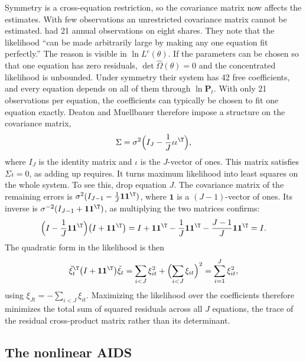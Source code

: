 Symmetry is a cross-equation restriction, so the covariance matrix now affects the estimates. With few
observations an unrestricted covariance matrix cannot be estimated. \citet[p.~318]{DeatonMuellbauer1980a}
had 21 annual observations on eight shares. They note that the likelihood ``can be made arbitrarily
large by making any one equation fit perfectly.'' The reason is visible in $\ln L^c(\theta)$. If the
parameters can be chosen so that one equation has zero residuals, $\det\hat\Omega(\theta) = 0$ and the
concentrated likelihood is unbounded. Under symmetry their system has 42 free coefficients, and every
equation depends on all of them through $\ln\mathbf{P}_t$. With only 21 observations per equation, the
coefficients can typically be chosen to fit one equation exactly. Deaton and Muellbauer therefore impose
a structure on the covariance matrix,
\begin{equation}\label{eq:05-dm-cov}
  \Sigma = \sigma^2\Bigl(I_J - \frac{1}{J}\iota\iota^{\T}\Bigr),
\end{equation}
where $I_J$ is the identity matrix and $\iota$ is the $J$-vector of ones. This matrix satisfies $\Sigma\iota = 0$, as adding up requires. It
turns maximum likelihood into least squares on the whole system. To see this, drop equation $J$. The
covariance matrix of the remaining errors is $\sigma^2(I_{J-1} - \frac{1}{J}\mathbf{1}\mathbf{1}^{\T})$,
where $\mathbf{1}$ is a $(J-1)$-vector of ones. Its inverse is $\sigma^{-2}(I_{J-1} +
\mathbf{1}\mathbf{1}^{\T})$, as multiplying the two matrices confirms:
\begin{equation*}
  \Bigl(I - \frac{1}{J}\mathbf{1}\mathbf{1}^{\T}\Bigr)\bigl(I + \mathbf{1}\mathbf{1}^{\T}\bigr)
  = I + \mathbf{1}\mathbf{1}^{\T} - \frac{1}{J}\mathbf{1}\mathbf{1}^{\T} - \frac{J-1}{J}\mathbf{1}\mathbf{1}^{\T}
  = I .
\end{equation*}
The quadratic form in the likelihood is then
\begin{equation*}
  \tilde\xi_t^{\T}\bigl(I + \mathbf{1}\mathbf{1}^{\T}\bigr)\tilde\xi_t
  = \sum_{i<J}\xi_{it}^2 + \Bigl(\sum_{i<J}\xi_{it}\Bigr)^2 = \sum_{i=1}^{J}\xi_{it}^2,
\end{equation*}
using $\xi_{Jt} = -\sum_{i<J}\xi_{it}$. Maximizing the likelihood over the coefficients therefore minimizes
the total sum of squared residuals across all $J$ equations, the trace of the residual cross-product
matrix rather than its determinant.

\subsection{The nonlinear AIDS}\label{sec:05-nl}

